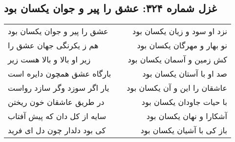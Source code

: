 \begin{center}
\section*{غزل شماره ۳۲۴: عشق را پیر و جوان یکسان بود}
\label{sec:324}
\begin{longtable}{l p{0.5cm} r}
عشق را پیر و جوان یکسان بود
&&
نزد او سود و زیان یکسان بود
\\
هم ز یکرنگی جهان عشق را
&&
نو بهار و مهرگان یکسان بود
\\
زیر او بالا و بالا هست زیر
&&
کش زمین و آسمان یکسان بود
\\
بارگاه عشق همچون دایره است
&&
صد او با آستان یکسان بود
\\
یار اگر سوزد وگر سازد رواست
&&
عاشقان را این و آن یکسان بود
\\
در طریق عاشقان خون ریختن
&&
با حیات جاودان یکسان بود
\\
سایه از کل دان که پیش آفتاب
&&
آشکارا و نهان یکسان بود
\\
کی بود دلدار چون دل ای فرید
&&
باز کی با آشیان یکسان بود
\\
\end{longtable}
\end{center}
